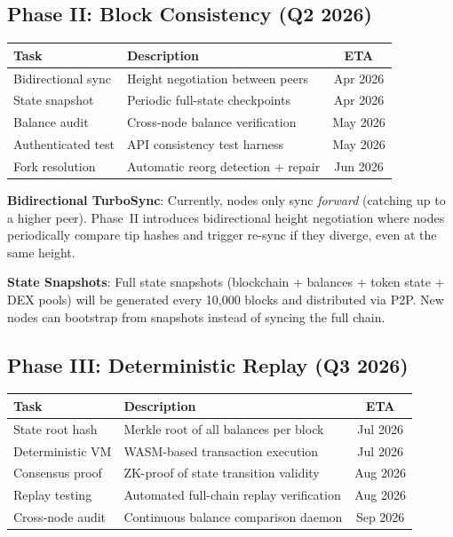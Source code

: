 \documentclass[11pt,a4paper,twocolumn]{article}
\begin{document}
\subsection{Phase II: Block Consistency (Q2 2026)}

\begin{table}[H]
\centering
\scriptsize
\begin{tabularx}{\columnwidth}{lXc}
\toprule
\textbf{Task} & \textbf{Description} & \textbf{ETA} \\
\midrule
Bidirectional sync & Height negotiation between peers & Apr 2026 \\
State snapshot & Periodic full-state checkpoints & Apr 2026 \\
Balance audit & Cross-node balance verification & May 2026 \\
Authenticated test & API consistency test harness & May 2026 \\
Fork resolution & Automatic reorg detection + repair & Jun 2026 \\
\bottomrule
\end{tabularx}
\end{table}

\noindent\textbf{Bidirectional TurboSync}: Currently, nodes only sync
\textit{forward} (catching up to a higher peer). Phase~II introduces
bidirectional height negotiation where nodes periodically compare tip
hashes and trigger re-sync if they diverge, even at the same height.

\noindent\textbf{State Snapshots}: Full state snapshots (blockchain +
balances + token state + DEX pools) will be generated every 10,000 blocks
and distributed via P2P. New nodes can bootstrap from snapshots instead
of syncing the full chain.

\subsection{Phase III: Deterministic Replay (Q3 2026)}

\begin{table}[H]
\centering
\scriptsize
\begin{tabularx}{\columnwidth}{lXc}
\toprule
\textbf{Task} & \textbf{Description} & \textbf{ETA} \\
\midrule
State root hash & Merkle root of all balances per block & Jul 2026 \\
Deterministic VM & WASM-based transaction execution & Jul 2026 \\
Consensus proof & ZK-proof of state transition validity & Aug 2026 \\
Replay testing & Automated full-chain replay verification & Aug 2026 \\
Cross-node audit & Continuous balance comparison daemon & Sep 2026 \\
\bottomrule
\end{tabularx}
\end{table}
\end{document}
